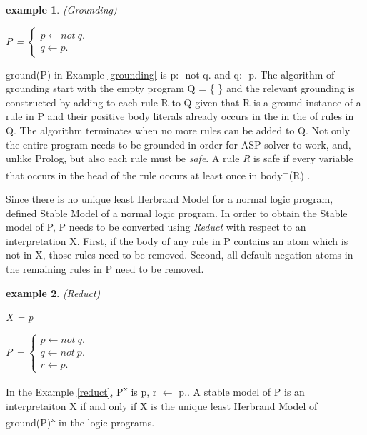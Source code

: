 \documentclass[12pt,twoside]{report}
\newtheorem{examp}{example}[section]
\begin{document}
\begin{examp} \normalfont (Grounding)

P = $\begin{cases}
	p  \leftarrow not \ q. \\
	q  \leftarrow p.
      \end{cases}$
\end{examp}
\label{grounding}

ground(P) in Example \ref{grounding} is p:- not q. and q:- p. The algorithm of grounding start with the empty program Q = \{  \} and the relevant grounding is constructed by adding to each rule R to Q given that R is a ground instance of a rule in P and their positive body literals already occurs in the in the of rules in Q. The algorithm terminates when no more rules can be added to Q.
Not only the entire program needs to be grounded in order for ASP solver to work, and, unlike Prolog,  but also each rule must be \textit{safe}. A rule \textit{R} is safe if every variable that occurs in the head of the rule occurs at least once in body\textsuperscript{+}(R) .

Since there is no unique least Herbrand Model for a normal logic program, \cite{Gelfond1988} defined Stable Model of a normal logic program. In order to obtain the Stable model of P, P needs to be converted using \textit{Reduct} with respect to an interpretation X. First, if the body of any rule in P contains an atom which is not in X, those rules need to be removed. Second, all default negation atoms in the remaining rules in P need to be removed.

\begin{examp} \normalfont (Reduct)

X = {p}

P = $\begin{cases}
	p  \leftarrow not\ q. \\
  q  \leftarrow not\ p. \\
  r  \leftarrow p.
      \end{cases}$
\end{examp}
\label{reduct}

In the Example \ref{reduct}, P\textsuperscript{x} is {p, r $\leftarrow$ p.}.
A stable model of P is an interpretaiton X if and only if X is the unique least Herbrand Model of ground(P)\textsuperscript{x} in the logic programs.
\end{document}
